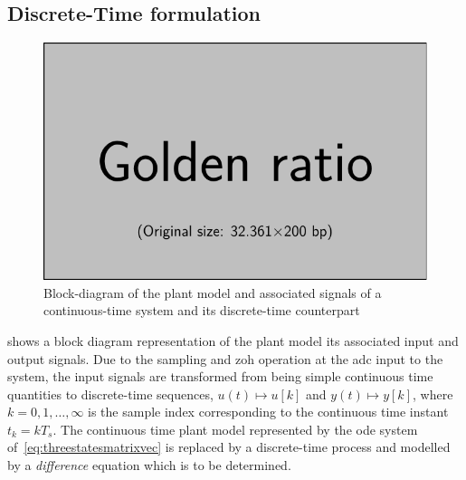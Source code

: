 \subsection{Discrete-Time  formulation}

\begin{figure}[htb]
    \centering
    \includegraphics{placeholder_images/example-image-golden.pdf}
    \caption[Block-diagram of continuous and discrete-time systems]{Block-diagram of the plant model and associated signals of a continuous-time system and its discrete-time counterpart}
    \label{fig:blockdiagctsdisc}
\end{figure}

 shows  a block  diagram representation of  the plant
model its associated input and output signals. Due to the sampling and \gls{zoh}
operation  at  the  \gls{adc}  input  to  the  system,  the  input  signals  are
transformed  from  being  simple  continuous time  quantities  to  discrete-time
sequences,  \ie{} $u(t)  \mapsto  u[k]$  and $y(t)  \mapsto  y[k]$,  where $k  =
0,1,\dots,∞$ is the sample index  corresponding to the continuous time instant
$t_k  = kT_s$.  The continuous  time plant  model represented  by the  \gls{ode}
system of~\cref{eq:threestatesmatrixvec} is replaced  by a discrete-time process
and modelled by a \emph{difference} equation which is to be determined.

